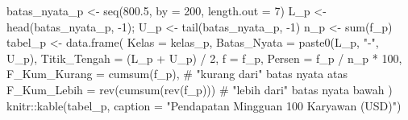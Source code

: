 \documentclass[
  indonesian,
  letterpaper,
]{book}
\newenvironment{Shaded}{\begin{snugshade}}{\end{snugshade}}
\newcommand{\AttributeTok}[1]{\textcolor[rgb]{0.40,0.45,0.13}{#1}}
\newcommand{\CommentTok}[1]{\textcolor[rgb]{0.37,0.37,0.37}{#1}}
\newcommand{\DecValTok}[1]{\textcolor[rgb]{0.68,0.00,0.00}{#1}}
\newcommand{\FloatTok}[1]{\textcolor[rgb]{0.68,0.00,0.00}{#1}}
\newcommand{\FunctionTok}[1]{\textcolor[rgb]{0.28,0.35,0.67}{#1}}
\newcommand{\NormalTok}[1]{\textcolor[rgb]{0.00,0.23,0.31}{#1}}
\newcommand{\OtherTok}[1]{\textcolor[rgb]{0.00,0.23,0.31}{#1}}
\newcommand{\SpecialCharTok}[1]{\textcolor[rgb]{0.37,0.37,0.37}{#1}}
\newcommand{\StringTok}[1]{\textcolor[rgb]{0.13,0.47,0.30}{#1}}
\begin{document}
\begin{Shaded}
\begin{Highlighting}[]
\NormalTok{batas\_nyata\_p }\OtherTok{\textless{}{-}} \FunctionTok{seq}\NormalTok{(}\FloatTok{800.5}\NormalTok{, }\AttributeTok{by =} \DecValTok{200}\NormalTok{, }\AttributeTok{length.out =} \DecValTok{7}\NormalTok{)}
\NormalTok{L\_p }\OtherTok{\textless{}{-}} \FunctionTok{head}\NormalTok{(batas\_nyata\_p, }\SpecialCharTok{{-}}\DecValTok{1}\NormalTok{); U\_p }\OtherTok{\textless{}{-}} \FunctionTok{tail}\NormalTok{(batas\_nyata\_p, }\SpecialCharTok{{-}}\DecValTok{1}\NormalTok{)}
\NormalTok{n\_p }\OtherTok{\textless{}{-}} \FunctionTok{sum}\NormalTok{(f\_p)}
\NormalTok{tabel\_p }\OtherTok{\textless{}{-}} \FunctionTok{data.frame}\NormalTok{(}
\AttributeTok{Kelas =}\NormalTok{ kelas\_p,}
\AttributeTok{Batas\_Nyata =} \FunctionTok{paste0}\NormalTok{(L\_p, }\StringTok{"{-}"}\NormalTok{, U\_p),}
\AttributeTok{Titik\_Tengah =}\NormalTok{ (L\_p }\SpecialCharTok{+}\NormalTok{ U\_p) }\SpecialCharTok{/} \DecValTok{2}\NormalTok{,}
\AttributeTok{f =}\NormalTok{ f\_p,}
\AttributeTok{Persen =}\NormalTok{ f\_p }\SpecialCharTok{/}\NormalTok{ n\_p }\SpecialCharTok{*} \DecValTok{100}\NormalTok{,}
\AttributeTok{F\_Kum\_Kurang =} \FunctionTok{cumsum}\NormalTok{(f\_p), }\CommentTok{\# "kurang dari" batas nyata atas}
\AttributeTok{F\_Kum\_Lebih =} \FunctionTok{rev}\NormalTok{(}\FunctionTok{cumsum}\NormalTok{(}\FunctionTok{rev}\NormalTok{(f\_p))) }\CommentTok{\# "lebih dari" batas nyata bawah}
\NormalTok{)}
\NormalTok{knitr}\SpecialCharTok{::}\FunctionTok{kable}\NormalTok{(tabel\_p, }\AttributeTok{caption =} \StringTok{"Pendapatan Mingguan 100 Karyawan (USD)"}\NormalTok{)}
\end{Highlighting}
\end{Shaded}
\end{document}
